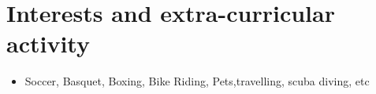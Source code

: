 \documentclass[11pt,a4paper,sans]{moderncv}        %
\begin{document}
\section{Interests and extra-curricular activity}

\vspace{6pt}

\begin{itemize}

\item{Soccer, Basquet, Boxing, Bike Riding, Pets,travelling, scuba diving, etc}

\vspace{6pt}

\end{itemize}

\nocite{*}



\end{document}
